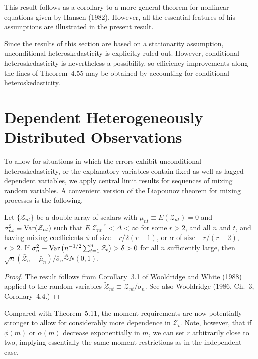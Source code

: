 This result follows as a corollary to a more general theorem for nonlinear equations given by Hansen (1982). However, all the essential features of his assumptions are illustrated in the present result.

Since the results of this section are based on a stationarity assumption, unconditional heteroskedasticity is explicitly ruled out. However, conditional heteroskedasticity is nevertheless a possibility, so efficiency improvements along the lines of Theorem~4.55 may be obtained by accounting for conditional heteroskedasticity.

\section{Dependent Heterogeneously Distributed Observations}\label{sec:clt-dhd}

To allow for situations in which the errors exhibit unconditional heteroskedasticity, or the explanatory variables contain fixed as well as lagged dependent variables, we apply central limit results for sequences of mixing random variables. A convenient version of the Liapounov theorem for mixing processes is the following.

\begin{theorem}\label{thm:wooldridge-white}
Let $\{\mathcal{Z}_{nt}\}$ be a double array of scalars with $\mu_{nt} \equiv E(\mathcal{Z}_{nt}) = 0$ and $\sigma_{nt}^2 \equiv \operatorname{Var}(\mathcal{Z}_{nt})$ such that $E|\mathcal{Z}_{nt}|^r < \Delta < \infty$ for some $r > 2$, and all $n$ and $t$, and having mixing coefficients $\phi$ of size $-r/2(r-1)$, or $\alpha$ of size $-r/(r-2)$, $r > 2$. If $\bar{\sigma}_n^2 \equiv \operatorname{Var}\left(n^{-1/2}\sum_{t=1}^{n}\mathcal{Z}_t\right) > \delta > 0$ for all $n$ sufficiently large, then $\sqrt{n}(\bar{\mathcal{Z}}_n - \bar{\mu}_n)/\bar{\sigma}_n \overset{A}{\sim} N(0,1)$.
\end{theorem}

\begin{proof}
The result follows from Corollary~3.1 of Wooldridge and White (1988) applied to the random variables $\tilde{\mathcal{Z}}_{nt} \equiv \mathcal{Z}_{nt}/\bar{\sigma}_n$. See also Wooldridge (1986, Ch.~3, Corollary~4.4.)
\end{proof}

Compared with Theorem~5.11, the moment requirements are now potentially stronger to allow for considerably more dependence in $\mathcal{Z}_t$. Note, however, that if $\phi(m)$ or $\alpha(m)$ decrease exponentially in $m$, we can set $r$ arbitrarily close to two, implying essentially the same moment restrictions as in the independent case.

